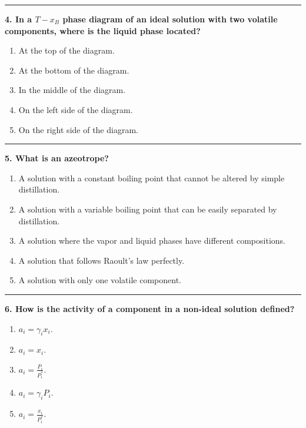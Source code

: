 \documentclass[
  9pt,
]{extbook}
\providecommand{\tightlist}{%
  \setlength{\itemsep}{0pt}\setlength{\parskip}{0pt}}
\theoremstyle{definition}
\theoremstyle{definition}
\theoremstyle{definition}
\theoremstyle{definition}
\theoremstyle{remark}
\begin{document}
\begin{center}\rule{0.5\linewidth}{0.5pt}\end{center}

\textbf{4. In a \(T-x_B\) phase diagram of an ideal solution with two volatile components, where is the liquid phase located?}

\begin{enumerate}
\def\labelenumi{\alph{enumi}.}
\tightlist
\item
  At the top of the diagram.
\item
  At the bottom of the diagram.
\item
  In the middle of the diagram.
\item
  On the left side of the diagram.
\item
  On the right side of the diagram.
\end{enumerate}

\begin{center}\rule{0.5\linewidth}{0.5pt}\end{center}

\textbf{5. What is an azeotrope?}

\begin{enumerate}
\def\labelenumi{\alph{enumi}.}
\tightlist
\item
  A solution with a constant boiling point that cannot be altered by simple distillation.
\item
  A solution with a variable boiling point that can be easily separated by distillation.
\item
  A solution where the vapor and liquid phases have different compositions.
\item
  A solution that follows Raoult's law perfectly.
\item
  A solution with only one volatile component.
\end{enumerate}

\begin{center}\rule{0.5\linewidth}{0.5pt}\end{center}

\textbf{6. How is the activity of a component in a non-ideal solution defined?}

\begin{enumerate}
\def\labelenumi{\alph{enumi}.}
\tightlist
\item
  \(a_i = \gamma_i x_i\).
\item
  \(a_i = x_i\).
\item
  \(a_i = \frac{P_i}{P^*_i}\).
\item
  \(a_i = \gamma_i P_i\).
\item
  \(a_i = \frac{x_i}{P^*_i}\).
\end{enumerate}
\end{document}
